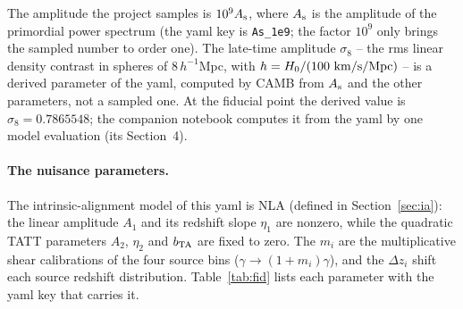 \documentclass[11pt]{article}
\newcommand{\us}{\_\allowbreak}
\numberwithin{equation}{section}
\begin{document}
The amplitude the project samples is $10^9 A_{\rm s}$, where
$A_{\rm s}$ is the amplitude of the primordial power spectrum (the
yaml key is \texttt{As\us 1e9}; the factor $10^9$ only brings the
sampled number to order one).  The late-time amplitude $\sigma_8$ --
the rms linear density contrast in spheres of $8\,h^{-1}$Mpc, with
$h = H_0/(100\ {\rm km/s/Mpc})$ -- is a derived parameter of the
yaml, computed by CAMB from $A_{\rm s}$ and the other parameters, not
a sampled one.  At the fiducial point the derived value is
$\sigma_8 = 0.7865548$; the companion notebook computes it from the
yaml by one model evaluation (its Section~4).

\paragraph{The nuisance parameters.}
The intrinsic-alignment model of this yaml is NLA (defined in
Section~\ref{sec:ia}): the linear amplitude $A_1$ and its redshift
slope $\eta_1$ are nonzero, while the quadratic TATT parameters
$A_2$, $\eta_2$ and $b_{\rm TA}$ are fixed to zero.  The $m_i$ are
the multiplicative shear calibrations of the four source bins
($\gamma \to (1+m_i)\gamma$), and the $\Delta z_i$ shift each source
redshift distribution.  Table~\ref{tab:fid} lists each parameter with
the yaml key that carries it.
\end{document}
